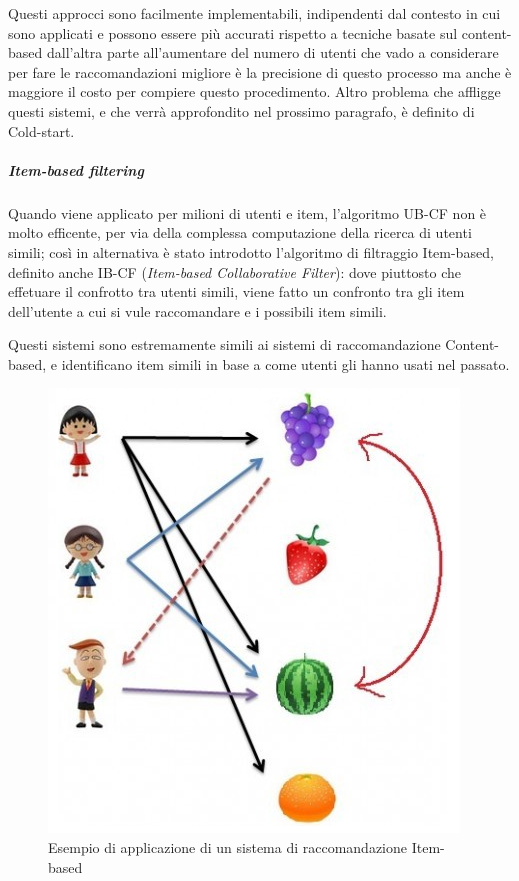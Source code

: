 Questi approcci sono facilmente implementabili, indipendenti dal contesto in cui sono applicati e possono essere più accurati rispetto
a tecniche basate sul content-based dall'altra parte all'aumentare del numero di utenti che vado a considerare per fare le 
raccomandazioni migliore è la precisione di questo processo ma anche è maggiore il costo per compiere questo procedimento. Altro 
problema che affligge questi sistemi, e che verrà approfondito nel prossimo paragrafo, è definito di Cold-start. 

\subparagraph{Item-based filtering} \hfill \break


Quando viene applicato per milioni di utenti e item, l'algoritmo UB-CF non è molto efficente, per via della complessa computazione della 
ricerca di utenti simili; così in alternativa è stato introdotto l'algoritmo di filtraggio Item-based, definito anche IB-CF 
(\textit{Item-based Collaborative Filter}): dove piuttosto che effetuare il confrotto tra utenti simili, viene fatto un confronto tra 
gli item dell'utente a cui si vule raccomandare e i possibili item simili.

Questi sistemi sono estremamente simili ai sistemi di raccomandazione Content-based, e identificano item simili in base a come utenti gli
hanno usati nel passato.


\cite{item-based-collaborative-filtering}

\begin{figure}[ht!]
	\centering
	\includegraphics[scale=0.5]{images/IB_CF_ex.PNG}
	\caption{Esempio di applicazione di un sistema di raccomandazione Item-based}
	\label{fig:IB_CF}
\end{figure}

